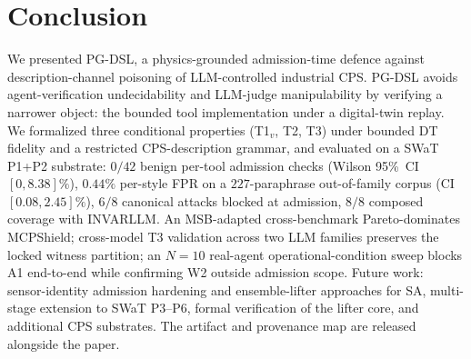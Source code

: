 \section{Conclusion}
\label{sec:conc}

We presented PG-DSL, a physics-grounded admission-time defence
against description-channel poisoning of LLM-controlled industrial
CPS. PG-DSL avoids agent-verification undecidability
\cite{trust_auth_sok} and LLM-judge manipulability
\cite{gaming_judge} by verifying a narrower object: the bounded
tool implementation under a digital-twin replay. We formalized three
conditional properties (T1${}_v$, T2, T3) under bounded DT fidelity
and a restricted CPS-description grammar, and evaluated on a SWaT
P1+P2 substrate: $0/42$ benign per-tool admission checks
(Wilson 95\%~CI~$[0, 8.38]\%$), $0.44\%$ per-style FPR on a
$227$-paraphrase out-of-family corpus (CI~$[0.08, 2.45]\%$), $6/8$
canonical attacks blocked at admission, $8/8$ composed coverage with
INVARLLM. An MSB-adapted cross-benchmark Pareto-dominates MCPShield;
cross-model T3 validation across two LLM families preserves the
locked witness partition; an $N=10$ real-agent operational-condition
sweep blocks A1 end-to-end while confirming W2 outside admission
scope. Future work: sensor-identity admission hardening and
ensemble-lifter approaches for SA, multi-stage extension to SWaT
P3--P6, formal verification of the lifter core, and additional CPS
substrates. The artifact and provenance map are released alongside
the paper.


